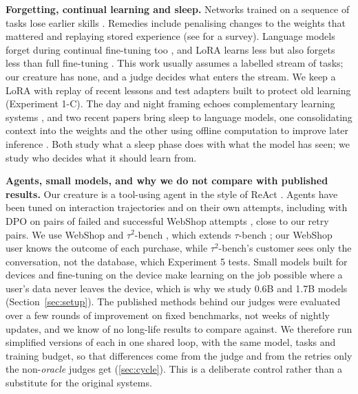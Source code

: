 \textbf{Forgetting, continual learning and sleep.} Networks trained on a sequence of tasks lose earlier skills \cite{mccloskey1989catastrophic}. Remedies include penalising changes to the weights that mattered \cite{kirkpatrick2017overcoming} and replaying stored experience \cite{rolnick2019experience} (see \cite{delange2022continual} for a survey). Language models forget during continual fine-tuning too \cite{luo2025empirical}, and LoRA \cite{hu2022lora} learns less but also forgets less than full fine-tuning \cite{biderman2024lora}. This work usually assumes a labelled stream of tasks; our creature has none, and a judge decides what enters the stream. We keep a LoRA with replay of recent lessons and test adapters built to protect old learning (Experiment 1-C). The day and night framing echoes complementary learning systems \cite{mcclelland1995why}, and two recent papers bring sleep to language models, one consolidating context into the weights \cite{behrouz2026language} and the other using offline computation to improve later inference \cite{lee2026do}. Both study what a sleep phase does with what the model has seen; we study who decides what it should learn from.

\textbf{Agents, small models, and why we do not compare with published results.} Our creature is a tool-using agent in the style of ReAct \cite{yao2023react}. Agents have been tuned on interaction trajectories \cite{zeng2024agenttuning} and on their own attempts, including with DPO on pairs of failed and successful WebShop attempts \cite{song2024trial}, close to our retry pairs. We use WebShop \cite{yao2022webshop} and $\tau^2$-bench \cite{barres2026tau2}, which extends $\tau$-bench \cite{yao2025taubench}; our WebShop user knows the outcome of each purchase, while $\tau^2$-bench's customer sees only the conversation, not the database, which Experiment 5 tests. Small models built for devices \cite{liu2024mobilellm, yang2025qwen3} and fine-tuning on the device \cite{zhu2023pockengine} make learning on the job possible where a user's data never leaves the device, which is why we study 0.6B and 1.7B models (Section~\ref{sec:setup}). The published methods behind our judges were evaluated over a few rounds of improvement on fixed benchmarks, not weeks of nightly updates, and we know of no long-life results to compare against. We therefore run simplified versions of each in one shared loop, with the same model, tasks and training budget, so that differences come from the judge and from the retries only the non-\emph{oracle} judges get (\ref{sec:cycle}). This is a deliberate control rather than a substitute for the original systems.
